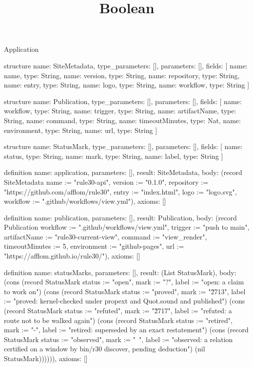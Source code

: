 \begin{lexlean}{Application}
\title{Boolean}
\begin{semanticmodule}
structure{
  name: SiteMetadata,
  type_parameters: [],
  parameters: [],
  fields: [
    {name: name, type: String},
    {name: version, type: String},
    {name: repository, type: String},
    {name: entry, type: String},
    {name: logo, type: String},
    {name: workflow, type: String}
  ]
}

structure{
  name: Publication,
  type_parameters: [],
  parameters: [],
  fields: [
    {name: workflow, type: String},
    {name: trigger, type: String},
    {name: artifactName, type: String},
    {name: command, type: String},
    {name: timeoutMinutes, type: Nat},
    {name: environment, type: String},
    {name: url, type: String}
  ]
}

structure{
  name: StatusMark,
  type_parameters: [],
  parameters: [],
  fields: [
    {name: status, type: String},
    {name: mark, type: String},
    {name: label, type: String}
  ]
}

definition{
  name: application,
  parameters: [],
  result: SiteMetadata,
  body: (record SiteMetadata {name := "rule30-api", version := "0.1.0", repository := "https://github.com/afflom/rule30", entry := "index.html", logo := "logo.svg", workflow := ".github/workflows/view.yml"}),
  axioms: []
}

definition{
  name: publication,
  parameters: [],
  result: Publication,
  body: (record Publication {workflow := ".github/workflows/view.yml", trigger := "push to main", artifactName := "rule30-current-view", command := "view_render", timeoutMinutes := 5, environment := "github-pages", url := "https://afflom.github.io/rule30/"}),
  axioms: []
}

definition{
  name: statusMarks,
  parameters: [],
  result: (List StatusMark),
  body: (cons (record StatusMark {status := "open", mark := "?", label := "open: a claim to work on"}) (cons (record StatusMark {status := "proved", mark := "\u2713", label := "proved: kernel-checked under propext and Quot.sound and published"}) (cons (record StatusMark {status := "refuted", mark := "\u2717", label := "refuted: a route not to be walked again"}) (cons (record StatusMark {status := "retired", mark := "-", label := "retired: superseded by an exact restatement"}) (cons (record StatusMark {status := "observed", mark := "~", label := "observed: a relation certified on a window by bin/r30 discover, pending deduction"}) (nil StatusMark)))))),
  axioms: []
}


\end{semanticmodule}
\end{lexlean}
